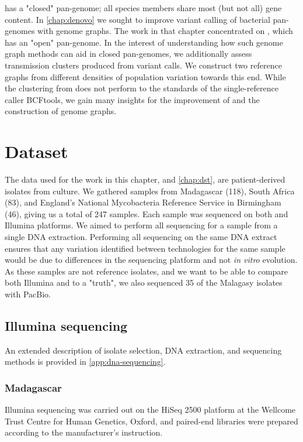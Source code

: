 \mtb{} has a "closed" pan-genome; all species members share most (but not all) gene content. In \autoref{chap:denovo} we sought to improve variant calling of bacterial pan-genomes with genome graphs. The work in that chapter concentrated on \ecoli{}, which has an "open" pan-genome. In the interest of understanding how such genome graph methods can aid in closed pan-genomes, we additionally assess transmission clusters produced from \pandora{} variant calls. We construct two \mtb{} reference graphs from different densities of population variation towards this end. While the clustering from \pandora{} does not perform to the standards of the single-reference caller BCFtools, we gain many insights for the improvement of \pandora{} and the construction of genome graphs.


\section{Dataset}
\label{sec:ch2-dataset}

The data used for the work in this chapter, and \autoref{chap:dst}, are patient-derived \mtb{} isolates from culture. We gathered samples from Madagascar (118), South Africa (83), and England's National Mycobacteria Reference Service in Birmingham (46), giving us a total of 247 samples.  
Each sample was sequenced on both \ont{} and Illumina platforms. We aimed to perform all sequencing for a sample from a single DNA extraction. Performing all sequencing on the same DNA extract ensures that any variation identified between technologies for the same sample would be due to differences in the sequencing platform and not \textit{in vitro} evolution.  
As these samples are not reference isolates, and we want to be able to compare both Illumina and \ont{} to a "truth", we also sequenced 35 of the Malagasy isolates with PacBio.

\subsection{Illumina sequencing}

An extended description of isolate selection, DNA extraction, and sequencing methods is provided in \autoref{app:dna-sequencing}.

\subsubsection{Madagascar}
Illumina sequencing was carried out on the HiSeq 2500 platform at the Wellcome Trust Centre for Human Genetics, Oxford, and paired-end libraries were prepared according to the manufacturer’s instruction. 

